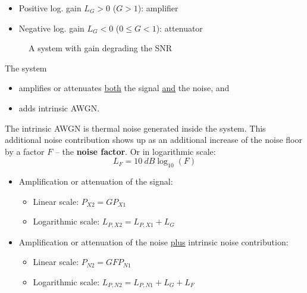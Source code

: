 \begin{refsection}
\begin{itemize}
	\item Positive log. gain $L_G > 0$ ($G > 1$): amplifier
	\item Negative log. gain $L_G < 0$ ($0 \leq G < 1$): attenuator
\end{itemize}

\begin{figure}[H]
	\centering
	\caption[A system with gain degrading the SNR]{A system with gain degrading the \ac{SNR}}
\end{figure}

The system
\begin{itemize}
	\item amplifies or attenuates \underline{both} the signal \underline{and} the noise, and
	\item adds intrinsic \ac{AWGN}.
\end{itemize}

The intrinsic \ac{AWGN} is thermal noise generated inside the system. This additional noise contribution shows up as an additional increase of the noise floor by a factor $F$ -- the  \textbf{noise factor}. Or in logarithmic scale:
\begin{equation}
	L_F = \SI{10}{dB} \log_{10} \left(F\right)
\end{equation}

\begin{itemize}
	\item Amplification or attenuation of the signal:
	\begin{itemize}
		\item Linear scale: $P_{X2} = G P_{X1}$
		\item Logarithmic scale: $L_{P,X2} = L_{P,X1} + L_G$
	\end{itemize}
	\item Amplification or attenuation of the noise \underline{plus} intrinsic noise contribution:
	\begin{itemize}
		\item Linear scale: $P_{N2} = G F P_{N1}$
		\item Logarithmic scale: $L_{P,N2} = L_{P,N1} + L_G + L_F$
	\end{itemize}
\end{itemize}


\end{refsection}
